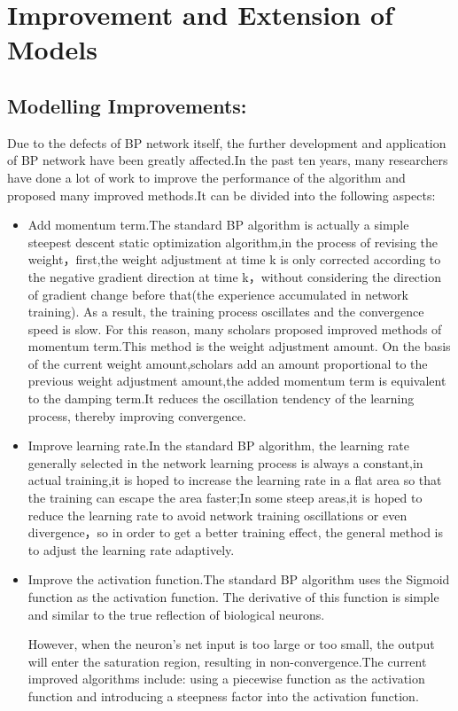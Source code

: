 \documentclass[12pt]{article}  %
\begin{document}
\section{Improvement and Extension of Models}

\subsection{Modelling Improvements:}
    Due to the defects of BP network itself, the further development and application of BP network have been greatly affected.In the past ten years, many researchers have done a lot of work to improve the performance of the algorithm and proposed many improved methods.It can be divided into the following aspects: 
 \begin{itemize}
    \item Add momentum term.The standard BP algorithm is actually a simple steepest descent static optimization algorithm,in the process of revising the weight，first,the weight adjustment at time k is only corrected according to the negative gradient direction at time k，without considering the direction of gradient change before that(the experience accumulated in network training). As a result, the training process oscillates and the convergence speed is slow. For this reason, many scholars proposed improved methods of momentum term.This method is the weight adjustment amount. On the basis of the current weight amount,scholars add an amount proportional to the previous weight adjustment amount,the added momentum term is equivalent to the damping term.It reduces the oscillation tendency of the learning process, thereby improving convergence.
    \item Improve learning rate.In the standard BP algorithm, the learning rate generally selected in the network learning process is always a constant,in actual training,it is hoped to increase the learning rate in a flat area so that the training can escape the area faster;In some steep areas,it is hoped to reduce the learning rate to avoid network training oscillations or even divergence，so in order to get a better training effect, the general method is to adjust the learning rate adaptively.
    \item Improve the activation function.The standard BP algorithm uses the Sigmoid function as the activation function. The derivative of this function is simple and similar to the true reflection of biological neurons.
    
    However, when the neuron's net input is too large or too small, the output will enter the saturation region, resulting in non-convergence.The current improved algorithms include: using a piecewise function as the activation function and introducing a steepness factor into the activation function.
    

\end{itemize}
\end{document}
